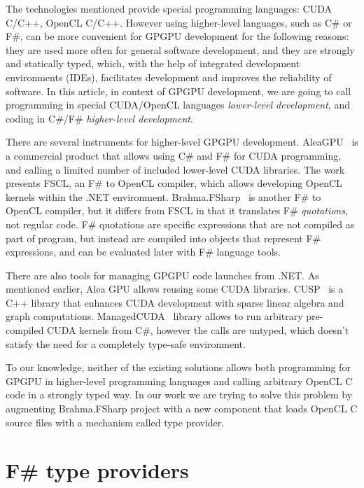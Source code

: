 \documentclass[sigplan,review]{acmart}\settopmatter{printfolios=true}
\begin{document}
The technologies mentioned provide special programming languages: CUDA C/C++, OpenCL C/C++. However using higher-level languages, such as C\# or F\#, can be more convenient for GPGPU development for the following reasons: they are used more often for general software development, and they are strongly and statically typed, which, with the help of integrated development environments (IDEs), facilitates development and improves the reliability of software. In this article, in context of GPGPU development, we are going to call programming in special CUDA/OpenCL languages \textit{lower-level development}, and coding in C\#/F\# \textit{higher-level development}.

There are several instruments for higher-level GPGPU development. AleaGPU~\cite{AleaGPU} is a commercial product that allows using C\# and F\# for CUDA programming, and calling a limited number of included lower-level CUDA libraries. The work~\cite{FSCL} presents FSCL, an F\# to OpenCL compiler, which allows developing OpenCL kernels within the .NET environment. Brahma.FSharp~\cite{Brahma_FSharp} is another F\# to OpenCL compiler, but it differs from FSCL in that it translates F\# \textit{quotations}, not regular code. F\# quotations are specific expressions that are not compiled as part of program, but instead are compiled into objects that represent F\# expressions, and can be evaluated later with F\# language tools.

There are also tools for managing GPGPU code launches from .NET. As mentioned earlier, Alea GPU allows reusing some CUDA libraries. CUSP~\cite{CUSP} is a C++ library that enhances CUDA development with sparse linear algebra and graph computations. ManagedCUDA~\cite{ManagedCUDA} library allows to run arbitrary pre-compiled CUDA kernels from C\#, however the calls are untyped, which doesn't satisfy the need for a completely type-safe environment.

To our knowledge, neither of the existing solutions allows both programming for GPGPU in higher-level programming languages and calling arbitrary OpenCL C code in a strongly typed way. In our work we are trying to solve this problem by augmenting Brahma.FSharp project with a new component that loads OpenCL C source files with a mechanism called type provider.

\section{F\# type providers}
\end{document}
